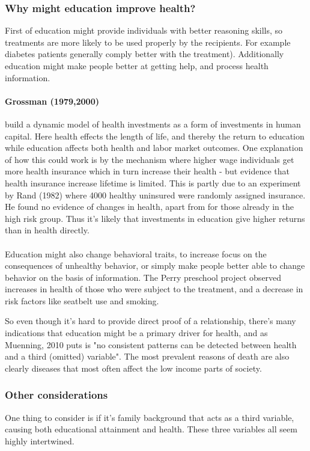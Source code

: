 \documentclass[12pt, a4paper]{article}
\begin{document}
\begin{multicols}{2}
\subsubsection{Why might education improve health?}
First of education might provide individuals with better reasoning skills, so treatments are more likely to be used properly by the recipients. For example diabetes patients generally comply better with the treatment). Additionally education might make people better at getting help, and process health information.

\paragraph{Grossman (1979,2000)} build a dynamic model of health investments as a form of investments in human capital. Here health effects the length of life, and thereby the return to education while education affects both health and labor market outcomes. One explanation of how this could work is by the mechanism where higher wage individuals get more health insurance which in turn increase their health - but evidence that health insurance increase lifetime is limited. This is partly due to an experiment by Rand (1982) where 4000 healthy uninsured were randomly assigned insurance. He found no evidence of changes in health, apart from for those already in the high risk group. Thus it's likely that investments in education give higher returns than in health directly.
\\ \\
Education might also change behavioral traits, to increase focus on the consequences of unhealthy behavior, or simply make people better able to change behavior on the basis of information. The Perry preschool project observed increases in health of those who were subject to the treatment, and a decrease in risk factors like seatbelt use and smoking.

So even though it's hard to provide direct proof of a relationship, there's many indications that education might be a primary driver for health, and as Muenning, 2010 puts is "no consistent patterns can be detected between health and a third (omitted) variable". The most prevalent reasons of death are also clearly diseases that most often affect the low income parts of society.

\subsubsection{Other considerations}
One thing to consider is if it's family background that acts as a third variable, causing both educational attainment and health. These three variables all seem highly intertwined.


\end{multicols}
\end{document}
